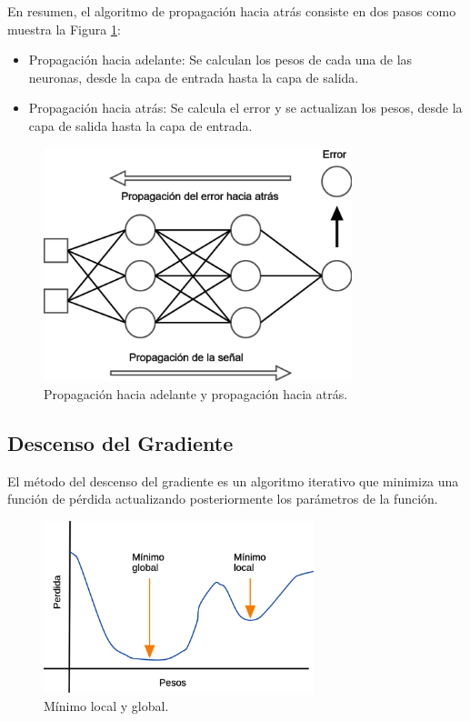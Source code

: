 En resumen, el algoritmo de propagación hacia atrás consiste en dos pasos como muestra la Figura \ref{fig:backpropagation}:

\begin{itemize}
\item Propagación hacia adelante: Se calculan los pesos de cada una de las neuronas, desde la capa de entrada hasta la capa de salida.

\item Propagación hacia atrás: Se calcula el error y se actualizan los pesos, desde la capa de salida hasta la capa de entrada.
\end{itemize}

\begin{figure}[H]
    \centering
    \includegraphics[width=0.8\textwidth]{MarcoTeorico/imgs/Backpropagation.png}
    \caption{Propagación hacia adelante y propagación hacia atrás.}
    \label{fig:backpropagation}
\end{figure}

\subsection{Descenso del Gradiente }

El método del descenso del gradiente es un algoritmo iterativo que minimiza una función de pérdida actualizando posteriormente los parámetros de la función.

\begin{figure}[H]
    \centering
    \includegraphics[width=0.7\textwidth]{MarcoTeorico/imgs/DescensoGradiente.png}
    \caption{Mínimo local y global.}
    \label{fig:descensoGradiente}
\end{figure}

